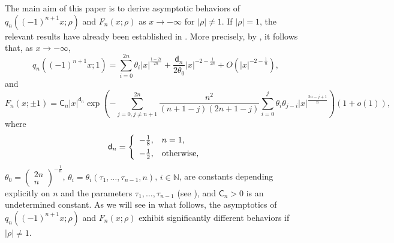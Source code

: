 \documentclass[11pt,a4paper]{article}
\numberwithin{equation}{section}
\newcommand{\msf}{\mathsf}
\begin{document}
The main aim of this paper is to derive asymptotic behaviors of $q_{n}\left((-1)^{n+1}x;\rho\right)$ and $F_n(x;\rho)$ as $x\to -\infty$ for $|\rho| \neq 1$. If $|\rho|=1$, the relevant results have already been established in \cite{CCG2021}. More precisely, by \cite[Theorem 1.6]{CCG2021}, it follows that, as $x\to -\infty$,
\begin{equation*}\label{q1}
q_{n}\left((-1)^{n+1}x;1\right)=\sum_{i=0}^{2n}\theta_i|x|^{\frac{1-2i}{2n}}+\frac{\msf d_n}{2\theta_0}|x|^{-2-\frac{1}{2n}}
+O\left(|x|^{-2-\frac{1}{n}}\right),
\end{equation*}
and
\begin{equation*}\label{F-asymptotic-infty3}
F_n(x;\pm 1)=\msf C_n|x|^{\msf d_n}
\exp\left(-\sum_{j=0,
j\neq n+1}^{2n}\frac{n^2}{(n+1-j)(2n+1-j)}\sum_{i=0}^j\theta_i\theta_{j-i}|x|^{\frac{2n-j+1}{n}}
\right)\left(1+o(1)\right),
\end{equation*}
where
$$
\msf d_n=\left\{
      \begin{array}{ll}
        -\frac18, & \hbox{$n=1$,}\vspace{1.5mm}
 \\

        -\frac12, & \hbox{otherwise,}
      \end{array}
    \right.
$$
$\theta_0=\begin{pmatrix} 2n \\ n \end{pmatrix}^{-\frac{1}{n}}$, $\theta_i=\theta_i(\tau_1,\ldots,\tau_{n-1},n)$, $i\in \mathbb{N}$, are constants depending explicitly on $n$ and the parameters  $\tau_1,\ldots,\tau_{n-1}$ (see \cite[Equation (1.16)]{CCG2021}), and $\msf C_n>0$ is an undetermined constant. As we will see in what follows, the asymptotics of $q_{n}\left((-1)^{n+1}x;\rho\right)$ and $F_n(x;\rho)$ exhibit significantly different behaviors if $|\rho|\neq 1$.
\end{document}
